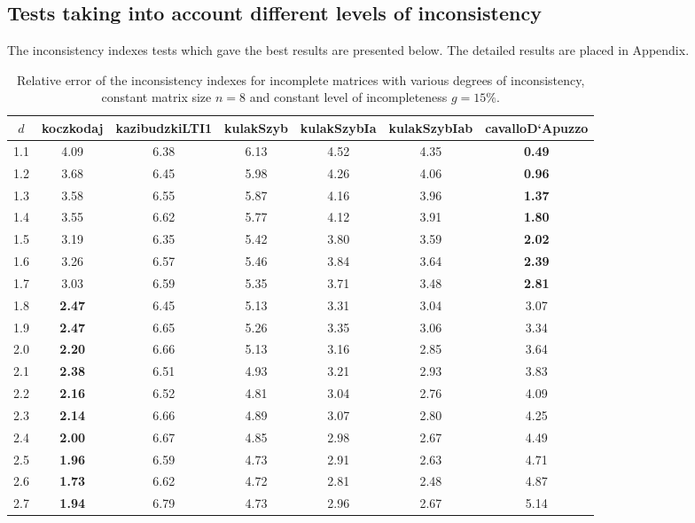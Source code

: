 \subsection{Tests taking into account different levels of inconsistency}
The inconsistency indexes tests which gave the best results are presented below. The detailed results are placed in Appendix.
\begin{table}[h]
\begin{center}
\caption{Relative error of the inconsistency indexes for incomplete matrices with various degrees of inconsistency, constant matrix size $n=8$ and constant level of incompleteness $g=15\%$.}
\label{tab:results1}
\begin{tabular}{|c||c|c|c|c|c|c|}
\hline $d$ & koczkodaj & kazibudzkiLTI1 & kulakSzyb & kulakSzybIa & kulakSzybIab & cavalloD`Apuzzo  \\ \hline \hline
1.1 & 4.09 & 6.38 & 6.13 & 4.52 & 4.35 & \textbf{0.49} \\ \hline
1.2 & 3.68 & 6.45 & 5.98 & 4.26 & 4.06 & \textbf{0.96} \\ \hline
1.3 & 3.58 & 6.55 & 5.87 & 4.16 & 3.96 & \textbf{1.37} \\ \hline
1.4 & 3.55 & 6.62 & 5.77 & 4.12 & 3.91 & \textbf{1.80} \\ \hline
1.5 & 3.19 & 6.35 & 5.42 & 3.80 & 3.59 & \textbf{2.02} \\ \hline
1.6 & 3.26 & 6.57 & 5.46 & 3.84 & 3.64 & \textbf{2.39} \\ \hline
1.7 & 3.03 & 6.59 & 5.35 & 3.71 & 3.48 & \textbf{2.81} \\ \hline
1.8 & \textbf{2.47} & 6.45 & 5.13 & 3.31 & 3.04 & 3.07 \\ \hline
1.9 & \textbf{2.47} & 6.65 & 5.26 & 3.35 & 3.06 & 3.34 \\ \hline
2.0 & \textbf{2.20} & 6.66 & 5.13 & 3.16 & 2.85 & 3.64 \\ \hline
2.1 & \textbf{2.38} & 6.51 & 4.93 & 3.21 & 2.93 & 3.83 \\ \hline
2.2 & \textbf{2.16} & 6.52 & 4.81 & 3.04 & 2.76 & 4.09 \\ \hline
2.3 & \textbf{2.14} & 6.66 & 4.89 & 3.07 & 2.80 & 4.25 \\ \hline
2.4 & \textbf{2.00} & 6.67 & 4.85 & 2.98 & 2.67 & 4.49 \\ \hline
2.5 & \textbf{1.96} & 6.59 & 4.73 & 2.91 & 2.63 & 4.71 \\ \hline
2.6 & \textbf{1.73} & 6.62 & 4.72 & 2.81 & 2.48 & 4.87 \\ \hline
2.7 & \textbf{1.94} & 6.79 & 4.73 & 2.96 & 2.67 & 5.14 \\ \hline

\end{tabular}
\end{center}
\end{table}
